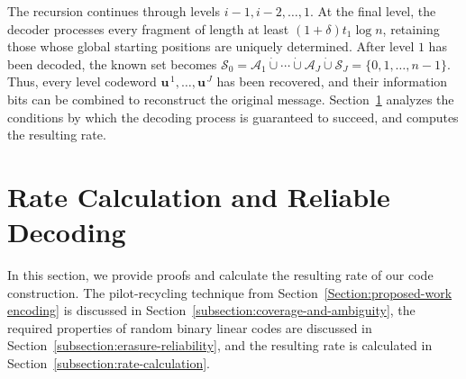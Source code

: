 \documentclass[journal,letterpaper,onecolumn,11pt]{IEEEtran}
\newcommand{\cA}{\mathcal{A}}
\newcommand{\cB}{\mathcal{B}}
\newcommand{\cC}{\mathcal{C}}
\newcommand{\cS}{\mathcal{S}}
\newcommand{\boldu}{\mathbf{u}}
\newcommand{\boldz}{\mathbf{z}}
\begin{document}
The recursion continues through levels \(i-1,i-2,\ldots,1\).
At the final level, the decoder processes every fragment of length at least
\((1+\delta)t_1\log n\), retaining those whose global starting positions are
uniquely determined. After level \(1\) has been decoded, the known set becomes
\(\cS_0=\cA_1\mathbin{\dot\cup}\cdots\mathbin{\dot\cup}\cA_J
\mathbin{\dot\cup}\cS_J=\{0,1,\ldots,n-1\}\). Thus, every level codeword
\(\boldu^{\,1},\ldots,\boldu^{\,J}\) has been recovered, and their
information bits can be combined to reconstruct the original message.
Section~\ref{Section:rate-and-reliability} analyzes the conditions by which the decoding process is guaranteed to succeed, and computes the resulting rate.




\section{Rate Calculation and Reliable Decoding}\label{Section:rate-and-reliability}
In this section, we provide  proofs and calculate the resulting rate of our code construction. 
The pilot-recycling technique from Section~\ref{Section:proposed-work encoding} is discussed in Section~\ref{subsection:coverage-and-ambiguity}, the required properties of random binary linear codes are discussed in Section~\ref{subsection:erasure-reliability}, and the resulting rate is calculated in Section~\ref{subsection:rate-calculation}.
\end{document}
